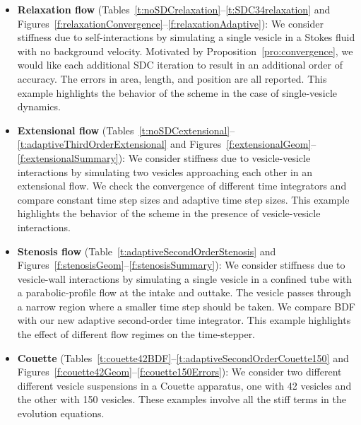 \begin{itemize}
\item{{\bf Relaxation flow}
(Tables~\ref{t:noSDCrelaxation}--\ref{t:SDC34relaxation} and
Figures~\ref{f:relaxationConvergence}--\ref{f:relaxationAdaptive}):} We
consider stiffness due to self-interactions by simulating a single
vesicle in a Stokes fluid with no background velocity.  Motivated by
Proposition~\ref{pro:convergence}, we would like each additional SDC
iteration to result in an additional order of accuracy.  The errors in
area, length, and position are all reported. This example highlights the
behavior of the scheme in the case of single-vesicle dynamics.

\item{{\bf Extensional flow}
(Tables~\ref{t:noSDCextensional}--\ref{t:adaptiveThirdOrderExtensional}
and Figures~\ref{f:extensionalGeom}--\ref{f:extensionalSummary}):} We
consider stiffness due to vesicle-vesicle interactions by simulating two
vesicles approaching each other in an extensional flow.  We check the
convergence of different time integrators and compare constant time step
sizes and adaptive time step sizes. This example highlights the
behavior of the scheme in the presence of vesicle-vesicle interactions.

\item{{\bf Stenosis flow} (Table~\ref{t:adaptiveSecondOrderStenosis} and
Figures~\ref{f:stenosisGeom}--\ref{f:stenosisSummary}):} We consider
stiffness due to vesicle-wall interactions by simulating a single
vesicle in a confined tube with a parabolic-profile flow at the intake
and outtake.  The vesicle passes through a narrow region where a
smaller time step should be taken.  We compare BDF with our new
adaptive second-order time integrator. This example highlights the
effect of different flow regimes on the time-stepper.


\item{{\bf Couette}
(Tables~\ref{t:couette42BDF}--\ref{t:adaptiveSecondOrderCouette150}
and Figures~\ref{f:couette42Geom}--\ref{f:couette150Errors}):} We
consider two different different vesicle suspensions in a Couette
apparatus, one with 42 vesicles and the other with 150 vesicles.
These examples involve all the stiff terms in the evolution equations.
\end{itemize}

